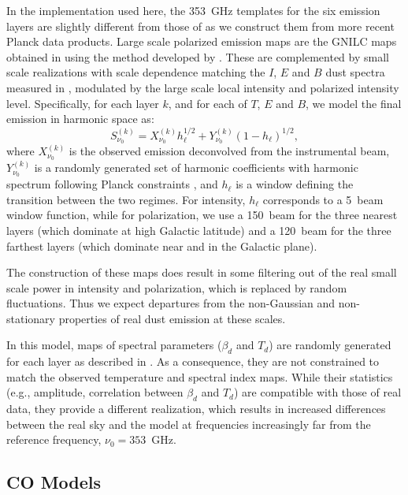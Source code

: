 \documentclass[twocolumn]{aastex631}
\begin{document}
In the implementation used here, the 353~GHz templates for the six emission layers are slightly different from those of \cite{Martinez-Solaeche:2018} as we construct them from more recent Planck data products. Large scale polarized emission maps are the GNILC maps obtained in \cite{planck2016-l04} using the method developed by \cite{Remazeilles:2011}. These are complemented by small scale realizations with scale dependence matching the $I$, $E$ and $B$ dust spectra measured in \cite{planck2016-l11A}, modulated by the large scale local intensity and polarized intensity level. Specifically, for each layer $k$, and for each of $T$, $E$ and $B$, we model the final emission in harmonic space as:
\begin{equation}
    S^{(k)}_{\nu_0} = X^{(k)}_{\nu_0} h_\ell^{1/2} + Y^{(k)}_{\nu_0} (1-h_\ell)^{1/2},
\end{equation}
where $X^{(k)}_{\nu_0}$ is the observed emission deconvolved from the instrumental beam, $Y^{(k)}_{\nu_0}$ is a randomly generated set of harmonic coefficients with harmonic spectrum following Planck constraints \citep{planck2016-l11A}, and $h_\ell$ is a window defining the transition between the two regimes. For intensity, $h_\ell$ corresponds to a 5\arcmin\ beam window function, while for polarization, we use a 150\arcmin\ beam for the three nearest layers (which dominate at high Galactic latitude) and a 120\arcmin\ beam for the three farthest layers (which dominate near and in the Galactic plane).

The construction of these maps does result in some filtering out of the real small scale power in intensity and polarization, which is replaced by random fluctuations. Thus we expect departures from the non-Gaussian and non-stationary properties of real dust emission at these scales.

In this model, maps of spectral parameters ($\beta_d$ and $T_d$) are randomly generated for each layer as described in \cite{Martinez-Solaeche:2018}. As a consequence, they are not constrained to match the observed temperature and spectral index maps. While their statistics (e.g., amplitude, correlation between $\beta_d$ and $T_d$) are compatible with those of real data, they provide a different realization, which results in increased differences between the real sky and the model at frequencies increasingly far from the reference frequency, $\nu_0 = 353$~GHz.

\subsection{CO Models} \label{subsec:co_models}
\end{document}
